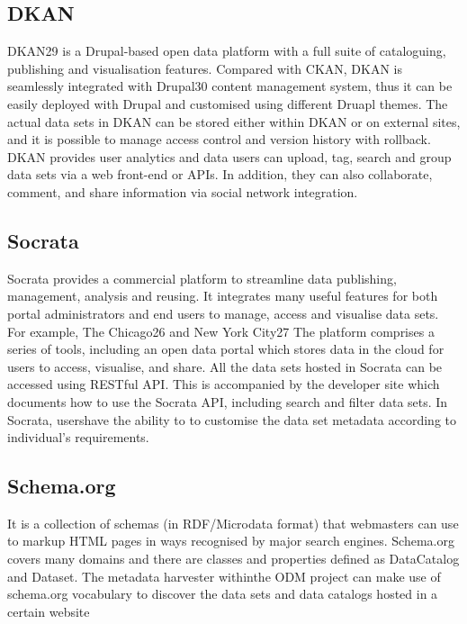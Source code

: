 \documentclass[runningheads,a4paper]{llncs}
\begin{document}
\subsection{DKAN}

DKAN29 is a Drupal-based open data platform with a full suite of cataloguing, publishing and visualisation features. Compared with CKAN, DKAN is seamlessly integrated with Drupal30 content management system, thus it can be easily deployed with Drupal and customised using different Druapl themes. The actual data sets in DKAN can be stored either within DKAN or on external sites, and it is possible to manage access control and version history with rollback. DKAN provides user analytics and data users can upload, tag, search and group data sets via a web front-end or APIs. In addition, they can also collaborate, comment, and share information via social network integration.

\subsection{Socrata}

Socrata provides a commercial platform to streamline data publishing, management, analysis and reusing. It integrates many useful features for both portal administrators and end users to manage, access and visualise data sets. For example, The Chicago26 and New York City27 The platform comprises a series of tools, including an open data portal which stores data in the cloud for users to access, visualise, and share. All the data sets hosted in Socrata can be accessed using RESTful API. This is accompanied by the developer site which documents how to use the Socrata API, including search and filter data sets. In Socrata, usershave the ability to to customise the data set metadata according to individual’s requirements.

\subsection{Schema.org}

It is a collection of schemas (in RDF/Microdata format) that webmasters can use to markup HTML pages in ways recognised by major search engines. Schema.org covers many domains and there are classes and properties defined as DataCatalog and Dataset. The metadata harvester withinthe ODM project can make use of schema.org vocabulary to discover the data sets and data catalogs hosted in a certain website
\end{document}
